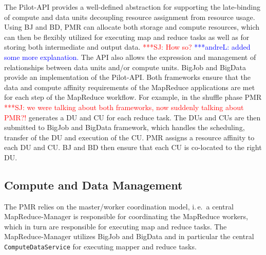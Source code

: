 \documentclass{acm_proc_article-sp}
\newcommand{\jhanote}[1]{ {\textcolor{red} { ***SJ: #1 }}}
\newcommand{\alnote}[1]{ {\textcolor{blue} { ***andreL: #1 }}}
\newcommand{\alnote}[1]{}
\newcommand{\jhanote}[1]{}
\newcommand{\upp}{\vspace*{-0.5em}}
\begin{document}

The Pilot-API provides a well-defined abstraction for supporting the
late-binding of compute and data units decoupling resource assignment from
resource usage. Using BJ and BD, PMR can allocate both storage and compute
resources, which can then be flexibly utilized for executing map and reduce
tasks as well as for storing both intermediate and output data. \jhanote{How
so?} \alnote{added some more explanation.} The API also allows the expression
and management of relationships between data units and/or compute units. BigJob
and BigData provide an implementation of the Pilot-API. Both frameworks ensure
that the data and compute affinity requirements of the MapReduce applications
are met for each step of the MapReduce workflow. For example, in the shuffle
phase PMR \jhanote{we were talking about both frameworks, now suddenly talking
about PMR?!} generates a DU and CU for each reduce task. The DUs and CUs are
then submitted to BigJob and BigData framework, which handles the scheduling,
transfer of the DU and execution of the CU. PMR assigns a resource affinity to
each DU and CU. BJ and BD then ensure that each CU is co-located to the right
DU.
\upp
\subsection{Compute and Data Management}
The PMR relies on the master/worker coordination model, i.\,e.\ a
central MapReduce-Manager is responsible for coordinating the
MapReduce workers, which in turn are responsible for executing map and
reduce tasks. The MapReduce-Manager utilizes BigJob and BigData and in 
particular the central \texttt{ComputeDataService} for executing
mapper and reduce tasks. %
\end{document}
